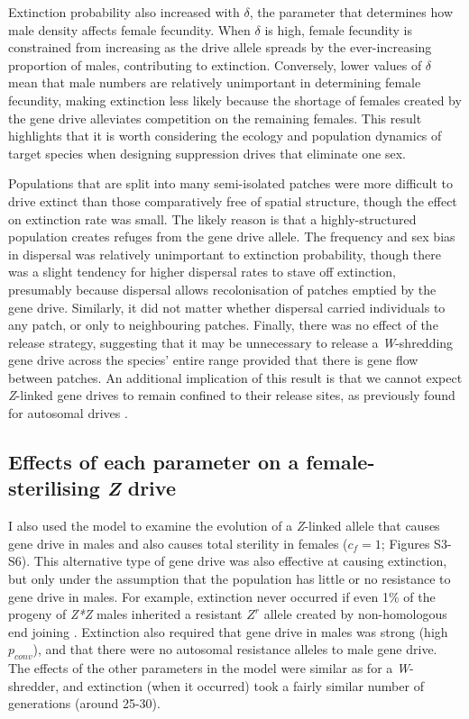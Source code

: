 \documentclass[]{rsos}%
\begin{document}
Extinction probability also increased with \(\delta\), the parameter
that determines how male density affects female fecundity. When
\(\delta\) is high, female fecundity is constrained from increasing as
the drive allele spreads by the ever-increasing proportion of males,
contributing to extinction. Conversely, lower values of \(\delta\) mean
that male numbers are relatively unimportant in determining female
fecundity, making extinction less likely because the shortage of females
created by the gene drive alleviates competition on the remaining
females. This result highlights that it is worth considering the ecology
and population dynamics of target species when designing suppression
drives that eliminate one sex.

Populations that are split into many semi-isolated patches were more
difficult to drive extinct than those comparatively free of spatial
structure, though the effect on extinction rate was small. The likely
reason is that a highly-structured population creates refuges from the
gene drive allele. The frequency and sex bias in dispersal was
relatively unimportant to extinction probability, though there was a
slight tendency for higher dispersal rates to stave off extinction,
presumably because dispersal allows recolonisation of patches emptied by
the gene drive. Similarly, it did not matter whether dispersal carried
individuals to any patch, or only to neighbouring patches. Finally,
there was no effect of the release strategy, suggesting that it may be
unnecessary to release a \emph{W}-shredding gene drive across the
species' entire range provided that there is gene flow between patches.
An additional implication of this result is that we cannot expect
\emph{Z}-linked gene drives to remain confined to their release sites,
as previously found for autosomal drives \citep{noble2018cu}.

\hypertarget{effects-of-each-parameter-on-a-female-sterilising-z-drive}{%
\subsection{\texorpdfstring{Effects of each parameter on a
female-sterilising \emph{Z}
drive}{Effects of each parameter on a female-sterilising Z drive}}\label{effects-of-each-parameter-on-a-female-sterilising-z-drive}}

I also used the model to examine the evolution of a \emph{Z}-linked
allele that causes gene drive in males and also causes total sterility
in females (\(c_f = 1\); Figures S3-S6). This alternative type of gene
drive was also effective at causing extinction, but only under the
assumption that the population has little or no resistance to gene drive
in males. For example, extinction never occurred if even 1\% of the
progeny of \emph{Z*Z} males inherited a resistant \(Z^r\) allele created
by non-homologous end joining \citep[c.f.][]{unckless2017ev}. Extinction
also required that gene drive in males was strong (high \(p_{conv}\)),
and that there were no autosomal resistance alleles to male gene drive.
The effects of the other parameters in the model were similar as for a
\emph{W}-shredder, and extinction (when it occurred) took a fairly
similar number of generations (around 25-30).
\end{document}
